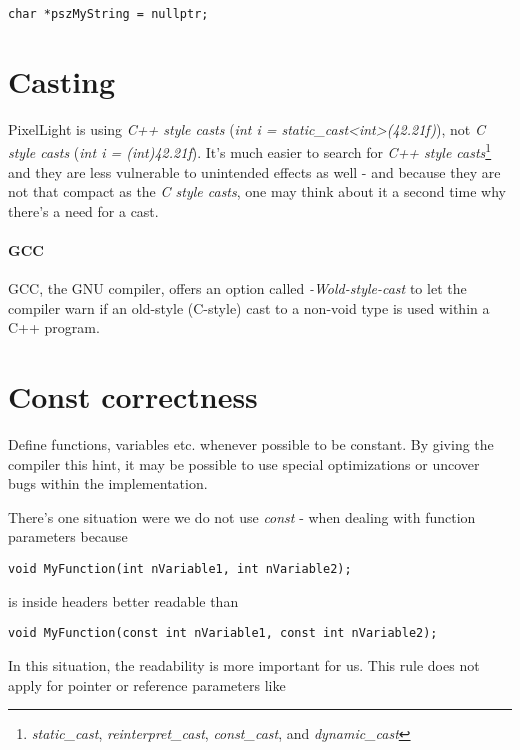 \begin{lstlisting}[caption=Null pointer]
char *pszMyString = nullptr;
\end{lstlisting}




\section{Casting}
PixelLight is using \emph{C++ style casts} (\emph{int i = static\_cast<int>(42.21f)}), not \emph{C style casts} (\emph{int i = (int)42.21f}). It's much easier to search for \emph{C++ style casts}\footnote{\emph{static\_cast}, \emph{reinterpret\_cast}, \emph{const\_cast}, and \emph{dynamic\_cast}} and they are less vulnerable to unintended effects as well - and because they are not that compact as the \emph{C style casts}, one may think about it a second time why there's a need for a cast.

\paragraph{GCC}
GCC, the GNU compiler, offers an option called \emph{-Wold-style-cast} to let the compiler warn if an old-style (C-style) cast to a non-void type is used within a C++ program.




\section{Const correctness}
Define functions, variables etc. whenever possible to be constant. By giving the compiler this hint, it may be possible to use special optimizations or uncover bugs within the implementation.

There's one situation were we do not use \emph{const} - when dealing with function parameters because

\begin{lstlisting}[caption=Function parameters]
void MyFunction(int nVariable1, int nVariable2);
\end{lstlisting}

is inside headers better readable than

\begin{lstlisting}[caption=Constant function parameters]
void MyFunction(const int nVariable1, const int nVariable2);
\end{lstlisting}

In this situation, the readability is more important for us. This rule does not apply for pointer or reference parameters like

